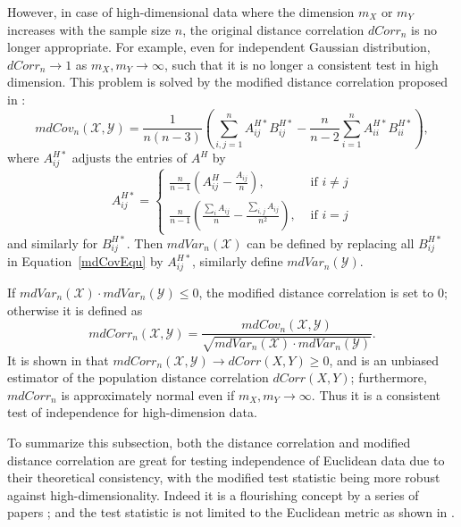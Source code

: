\documentclass[12pt]{article}
\begin{document}
However, in case of high-dimensional data where the dimension $m_{X}$ or $m_{Y}$ increases with the sample size $n$, the original distance correlation $dCorr_{n}$ is no longer appropriate. For example, even for independent Gaussian distribution, $dCorr_{n} \rightarrow 1$ as $m_{X}, m_{Y} \rightarrow \infty$, such that it is no longer a consistent test in high dimension. This problem is solved by the modified distance correlation proposed in \cite{SzekelyRizzo2013a}:
\begin{equation}
\label{mdCovEqu}
mdCov_{n}(\mathcal{X},\mathcal{Y})=\frac{1}{n(n-3)}(\sum_{i,j=1}^{n}A^{H*}_{ij}B^{H*}_{ij}-\frac{n}{n-2}\sum_{i=1}^{n}A^{H*}_{ii}B^{H*}_{ii}),
\end{equation}
where $A^{H*}_{ij}$ adjusts the entries of $A^{H}$ by
\[A^{H*}_{ij} = \left\{
  \begin{array}{lr}
    \frac{n}{n-1}(A^{H}_{ij}-\frac{A_{ij}}{n}), & \mbox{ if } i \neq j \\
    \frac{n}{n-1}(\frac{\sum_{i}A_{ij}}{n}-\frac{\sum_{i,j}A_{ij}}{n^2}), &\mbox{ if } i = j
  \end{array}
\right.
\] and similarly for $B^{H*}_{ij}$. Then $mdVar_{n}(\mathcal{X})$ can be defined by replacing all $B^{H*}_{ij}$ in Equation~\ref{mdCovEqu} by $A^{H*}_{ij}$, similarly define $mdVar_{n}(\mathcal{Y})$. 

If $mdVar_{n}(\mathcal{X}) \cdot mdVar_{n}(\mathcal{Y}) \leq 0$, the modified distance correlation is set to $0$; otherwise it is defined as
\begin{equation}
\label{mdCorrEqu}
mdCorr_{n}(\mathcal{X},\mathcal{Y})=\frac{mdCov_{n}(\mathcal{X},\mathcal{Y})}{\sqrt{mdVar_{n}(\mathcal{X}) \cdot mdVar_{n}(\mathcal{Y})}}.
\end{equation}
It is shown in \cite{SzekelyRizzo2013a} that $mdCorr_{n}(\mathcal{X},\mathcal{Y}) \rightarrow dCorr(X,Y) \geq 0$, and is an unbiased estimator of the population distance correlation $dCorr(X,Y)$; furthermore, $mdCorr_{n}$ is approximately normal even if $m_{X},m_{Y} \rightarrow \infty$. Thus it is a consistent test of independence for high-dimension data.

To summarize this subsection, both the distance correlation and modified distance correlation are great for testing independence of Euclidean data due to their theoretical consistency, with the modified test statistic being more robust against high-dimensionality. Indeed it is a flourishing concept by a series of papers \cite{BakirovRizzoSzekely2006, SzekelyRizzoBakirov2007, SzekelyRizzo2009, BickelXu2009, Kosorok2009, Remillard2009, LiZhongZhu2012, SzekelyRizzo2013a, SzekelyRizzo2013b, SzekelyRizzo2014}; and the test statistic is not limited to the Euclidean metric as shown in \cite{Lyons2013}. 
\end{document}
